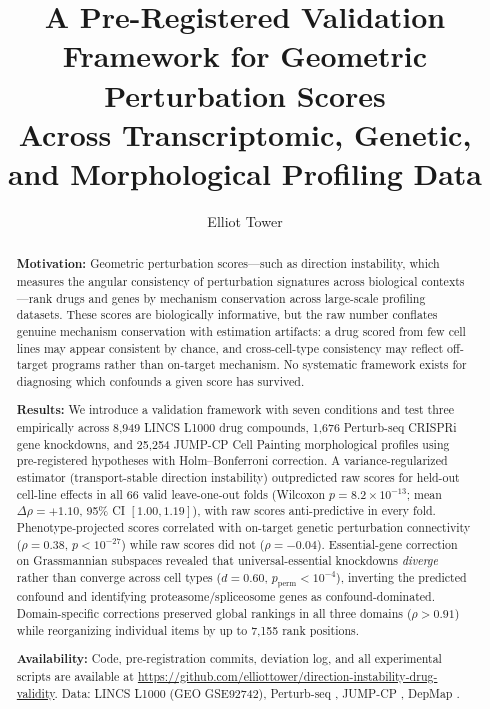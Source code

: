 \documentclass[11pt]{article}
\title{A Pre-Registered Validation Framework for Geometric Perturbation Scores\\Across Transcriptomic, Genetic, and Morphological Profiling Data}
\author{Elliot Tower}
\affil{Independent researcher \\ \texttt{elliot@elliottower.ai}}
\date{}
\begin{document}
\maketitle

\begin{abstract}
\textbf{Motivation:}
Geometric perturbation scores---such as direction instability, which
measures the angular consistency of perturbation signatures across
biological contexts---rank drugs and genes by mechanism conservation
across large-scale profiling datasets. These scores are biologically
informative, but the raw number conflates genuine mechanism conservation
with estimation artifacts: a drug scored from few cell lines may appear
consistent by chance, and cross-cell-type consistency may reflect
off-target programs rather than on-target mechanism. No systematic
framework exists for diagnosing which confounds a given score has survived.

\textbf{Results:}
We introduce a validation framework with seven conditions and test three
empirically across 8{,}949 LINCS L1000 drug compounds, 1{,}676
Perturb-seq CRISPRi gene knockdowns, and 25{,}254 JUMP-CP Cell Painting
morphological profiles using pre-registered hypotheses with
Holm--Bonferroni correction. A variance-regularized estimator
(transport-stable direction instability) outpredicted raw scores for
held-out cell-line effects in all 66 valid leave-one-out folds
(Wilcoxon $p = 8.2 \times 10^{-13}$; mean $\Delta\rho = +1.10$, 95\%
CI $[1.00, 1.19]$), with raw scores anti-predictive in every fold.
Phenotype-projected scores correlated with on-target genetic perturbation
connectivity ($\rho = 0.38$, $p < 10^{-27}$) while raw scores did not
($\rho = -0.04$). Essential-gene correction on Grassmannian subspaces
revealed that universal-essential knockdowns \emph{diverge} rather than
converge across cell types ($d = 0.60$, $p_{\text{perm}} < 10^{-4}$),
inverting the predicted confound and identifying proteasome/spliceosome
genes as confound-dominated. Domain-specific corrections preserved global
rankings in all three domains ($\rho > 0.91$) while reorganizing
individual items by up to 7{,}155 rank positions.

\textbf{Availability:}
Code, pre-registration commits, deviation log, and all experimental
scripts are available at
\url{https://github.com/elliottower/direction-instability-drug-validity}.
Data: LINCS L1000 (GEO GSE92742), Perturb-seq
\citep{replogle2022mapping}, JUMP-CP \citep{chandrasekaran2023jump},
DepMap \citep{dempster2021chronos}.
\end{abstract}
\end{document}
